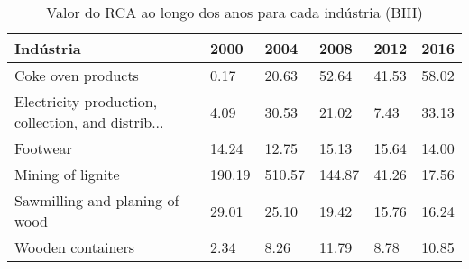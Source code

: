\begin{table}
\centering
\caption{Valor do RCA ao longo dos anos para cada indústria (BIH)}
\begin{tabular}{p{6cm}p{1.5cm}p{1.5cm}p{1.5cm}p{1.5cm}p{1.5cm}}
\toprule
                                         Indústria &   2000 &   2004 &   2008 &  2012 &  2016 \\
\midrule
                                Coke oven products &   0.17 &  20.63 &  52.64 & 41.53 & 58.02 \\
Electricity production, collection, and distrib... &   4.09 &  30.53 &  21.02 &  7.43 & 33.13 \\
                                          Footwear &  14.24 &  12.75 &  15.13 & 15.64 & 14.00 \\
                                 Mining of lignite & 190.19 & 510.57 & 144.87 & 41.26 & 17.56 \\
                    Sawmilling and planing of wood &  29.01 &  25.10 &  19.42 & 15.76 & 16.24 \\
                                 Wooden containers &   2.34 &   8.26 &  11.79 &  8.78 & 10.85 \\
\bottomrule
\end{tabular}
\end{table}
